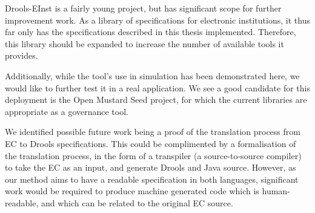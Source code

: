 Drools-EInst is a fairly young project, but has significant scope for further
improvement work. As a library of specifications for electronic institutions,
it thus far only has the specifications described in this thesis implemented.
Therefore, this library should be expanded to increase the number of available
tools it provides.

Additionally, while the tool's use in simulation has been demonstrated here,
we would like to further test it in a real application. We see a good candidate for
this deployment is the Open Mustard Seed project, for which the current
libraries are appropriate as a governance tool.

We identified possible future work being a proof of the translation process
from \ac{EC} to Drools specifications. This could be complimented by a
formalisation of the translation process, in the form of a transpiler (a
source-to-source compiler) to take the \ac{EC} as an input, and generate
Drools and Java source. However, as our method aims to have a readable
specification in both languages, significant work would be required to produce
machine generated code which is human-readable, and which can be related to the original
\ac{EC} source.

